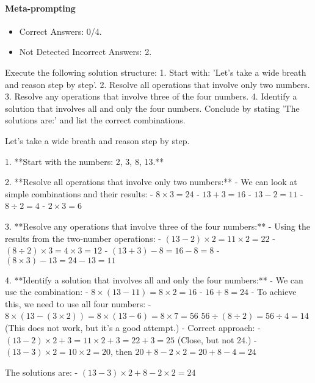 \paragraph{Meta-prompting}
\begin{itemize}
    \item Correct Answers: 0/4.
    \item Not Detected Incorrect Answers: 2.
\end{itemize}
\begin{dialogue}
\begin{small}\begin{spverbatim}
Execute the following solution structure: 1. Start with: 'Let’s take a wide breath and reason step by step'. 2. Resolve all operations that involve only two numbers. 3. Resolve any operations that involve three of the four numbers. 4. Identify a solution that involves all and only the four numbers. Conclude by stating 'The solutions are:' and list the correct combinations. 
\end{spverbatim}\end{small}
\begin{small}\begin{spverbatim}
Let's take a wide breath and reason step by step.

1. **Start with the numbers: 2, 3, 8, 13.**

2. **Resolve all operations that involve only two numbers:**
   - We can look at simple combinations and their results:
     - \( 8 \times 3 = 24 \)
     - \( 13 + 3 = 16 \)
     - \( 13 - 2 = 11 \)
     - \( 8 \div 2 = 4 \)
     - \( 2 \times 3 = 6 \)

3. **Resolve any operations that involve three of the four numbers:**
   - Using the results from the two-number operations:
     - \( (13 - 2) \times 2 = 11 \times 2 = 22 \)
     - \( (8 \div 2) \times 3 = 4 \times 3 = 12 \)
     - \( (13 + 3) - 8 = 16 - 8 = 8 \)
     - \( (8 \times 3) - 13 = 24 - 13 = 11 \)

4. **Identify a solution that involves all and only the four numbers:**
   - We can use the combination:
     - \( 8 \times (13 - 11) = 8 \times 2 = 16 \)
     - \( 16 + 8 = 24 \)
   - To achieve this, we need to use all four numbers:
     - \( 8 \times (13 - (3 \times 2)) = 8 \times (13 - 6) = 8 \times 7 = 56 \)
     \( 56 \div (8 \div 2) = 56 \div 4 = 14 \) (This does not work, but it's a good attempt.)
   - Correct approach:
     - \( (13 - 2) \times 2 + 3 = 11 \times 2 + 3 = 22 + 3 = 25 \) (Close, but not 24.)
     - \( (13 - 3) \times 2 = 10 \times 2 = 20 \), then \( 20 + 8 - 2 \times 2 = 20 + 8 - 4 = 24 \)

The solutions are:
- \( (13 - 3) \times 2 + 8 - 2 \times 2 = 24 \)
\end{spverbatim}\end{small}
\end{dialogue}



